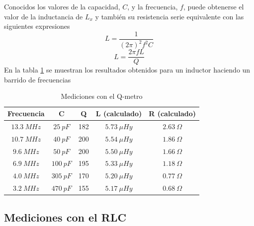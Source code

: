 \documentclass[a4paper,10pt]{article}
\begin{document}
		Conocidos los valores de la capacidad, $C$, y la frecuencia, $f$, puede obtenerse el valor de la inductancia de $L_x$ y tambi\'en su resistencia serie equivalente con las siguientes expresiones
		$$L=\frac{1}{(2\pi)^2 f^2C}$$
		$$L=\frac{2\pi fL}{Q}$$
		En la tabla \ref{tab001} se muestran los resultados obtenidos para un inductor haciendo un barrido de frecuencias
		
		\begin{table}[!htp]
					\centering
					\begin{tabular}{|c|c|c|c|c|}
						\hline
			    		Frecuencia & C & Q & L (calculado) & R (calculado) \\
						\hline
						$13.3~MHz$& $25~pF$& 182 & $5.73~\mu Hy$ &$ 2.63~\Omega$ \\
						\hline
						$10.7~MHz$& $40~pF$& 200 & $5.54~\mu Hy$ &$ 1.86~\Omega$ \\
						\hline
						$9.6~MHz$& $50~pF$& 200 & $5.50~\mu Hy$ &$ 1.66~\Omega$ \\
						\hline  
						$6.9~MHz$& $100~pF$& 195 & $5.33~\mu Hy$ &$ 1.18~\Omega$ \\
						\hline  										
						$4.0~MHz$& $305~pF$& 170 & $5.20~\mu Hy$ &$ 0.77~\Omega$ \\
						\hline
						$3.2~MHz$& $470~pF$& 155 & $5.17~\mu Hy$ &$ 0.68~\Omega$ \\
						\hline  						  	  
					\end{tabular}
					\caption{Mediciones con el Q-metro} \label{tab001}
				\end{table}
		\subsection{Mediciones con el RLC}		
		
\end{document}
